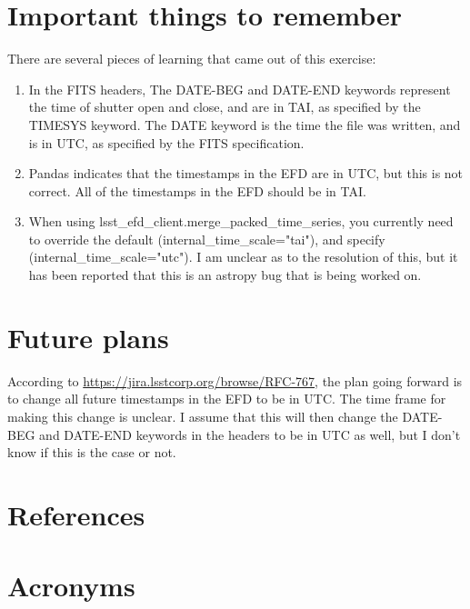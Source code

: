 \documentclass[SE,authoryear,toc]{lsstdoc}
\begin{document}
\section{Important things to remember}

There are several pieces of learning that came out of this exercise:
\begin{enumerate}
  \item In the FITS headers, The DATE-BEG and DATE-END keywords represent the time of shutter open and close, and are in TAI, as specified by the TIMESYS keyword.  The DATE keyword is the time the file was written, and is in UTC, as specified by the FITS specification.
  \item Pandas indicates that the timestamps in the EFD are in UTC, but this is not correct.  All of the timestamps in the EFD should be in TAI.
    \item When using lsst\_efd\_client.merge\_packed\_time\_series, you currently need to override the default (internal\_time\_scale="tai"), and specify (internal\_time\_scale="utc").  I am unclear as to the resolution of this, but it has been reported that this is an astropy bug that is being worked on.
\end{enumerate}

\section{Future plans}

According to \url{https://jira.lsstcorp.org/browse/RFC-767}, the plan going forward is to change all future timestamps in the EFD to be in UTC.  The time frame for making this change is unclear.  I assume that this will then change the DATE-BEG and DATE-END keywords in the headers to be in UTC as well, but I don't know if this is the case or not.




\appendix
\section{References} \label{sec:bib}
\renewcommand{\refname}{} %


\section{Acronyms} \label{sec:acronyms}

\end{document}
